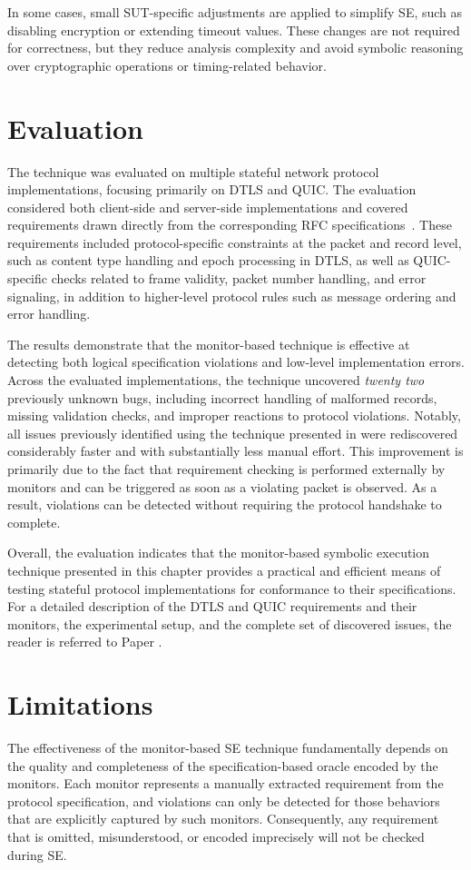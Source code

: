 In some cases, small SUT-specific adjustments are applied to simplify SE, such as disabling encryption or extending timeout values.
These changes are not required for correctness, but they reduce analysis complexity and avoid symbolic reasoning over cryptographic operations or timing-related behavior.

\section{Evaluation}
The technique was evaluated on multiple stateful network protocol implementations, focusing primarily on DTLS and QUIC.
The evaluation considered both client-side and server-side implementations and covered requirements drawn directly from the corresponding RFC specifications~\cite{RFC6347, RFC5246, RFC9000}.
These requirements included protocol-specific constraints at the packet and record level, such as content type handling and epoch processing in DTLS, as well as QUIC-specific checks related to frame validity, packet number handling, and error signaling, in addition to higher-level protocol rules such as message ordering and error handling.

The results demonstrate that the monitor-based technique is effective at detecting both logical specification violations and low-level implementation errors.
Across the evaluated implementations, the technique uncovered \emph{twenty two} previously unknown bugs, including incorrect handling of malformed records, missing validation checks, and improper reactions to protocol violations.
Notably, all issues previously identified using the technique presented in  were rediscovered considerably faster and with substantially less manual effort.
This improvement is primarily due to the fact that requirement checking is performed externally by monitors and can be triggered as soon as a violating packet is observed.
As a result, violations can be detected without requiring the protocol handshake to complete.

Overall, the evaluation indicates that the monitor-based symbolic execution technique presented in this chapter provides a practical and efficient means of testing stateful protocol implementations for conformance to their specifications.
For a detailed description of the DTLS and QUIC requirements and their monitors, the experimental setup, and the complete set of discovered issues, the reader is referred to Paper .

\section{Limitations}\label{sec:paper2-limitations}
The effectiveness of the monitor-based SE technique fundamentally depends on the quality and completeness of the specification-based oracle encoded by the monitors.
Each monitor represents a manually extracted requirement from the protocol specification, and violations can only be detected for those behaviors that are explicitly captured by such monitors.
Consequently, any requirement that is omitted, misunderstood, or encoded imprecisely will not be checked during SE.

